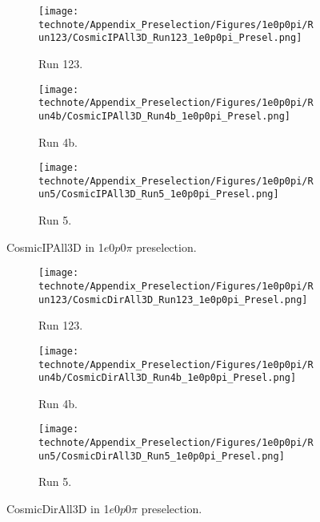 \begin{figure}[H]
    \centering
    \begin{subfigure}[t]{0.32\linewidth}
        \texttt{[image: technote/Appendix\_Preselection/Figures/1e0p0pi/Run123/CosmicIPAll3D\_Run123\_1e0p0pi\_Presel.png]}
        \caption{Run 123.}
    \end{subfigure}%
    \hspace{0.2cm}%
    \begin{subfigure}[t]{0.32\linewidth}
        \texttt{[image: technote/Appendix\_Preselection/Figures/1e0p0pi/Run4b/CosmicIPAll3D\_Run4b\_1e0p0pi\_Presel.png]}
        \caption{Run 4b.}
    \end{subfigure}%
    \hspace{0.2cm}%
    \begin{subfigure}[t]{0.32\linewidth}
        \texttt{[image: technote/Appendix\_Preselection/Figures/1e0p0pi/Run5/CosmicIPAll3D\_Run5\_1e0p0pi\_Presel.png]}
        \caption{Run 5.}
    \end{subfigure}
    \caption{CosmicIPAll3D in 1$e$0$p$0$\pi$ preselection.}
\end{figure}

\begin{figure}[H]
    \centering
    \begin{subfigure}[t]{0.32\linewidth}
        \texttt{[image: technote/Appendix\_Preselection/Figures/1e0p0pi/Run123/CosmicDirAll3D\_Run123\_1e0p0pi\_Presel.png]}
        \caption{Run 123.}
    \end{subfigure}%
    \hspace{0.2cm}%
    \begin{subfigure}[t]{0.32\linewidth}
        \texttt{[image: technote/Appendix\_Preselection/Figures/1e0p0pi/Run4b/CosmicDirAll3D\_Run4b\_1e0p0pi\_Presel.png]}
        \caption{Run 4b.}
    \end{subfigure}%
    \hspace{0.2cm}%
    \begin{subfigure}[t]{0.32\linewidth}
        \texttt{[image: technote/Appendix\_Preselection/Figures/1e0p0pi/Run5/CosmicDirAll3D\_Run5\_1e0p0pi\_Presel.png]}
        \caption{Run 5.}
    \end{subfigure}
    \caption{CosmicDirAll3D in 1$e$0$p$0$\pi$ preselection.}
\end{figure}


